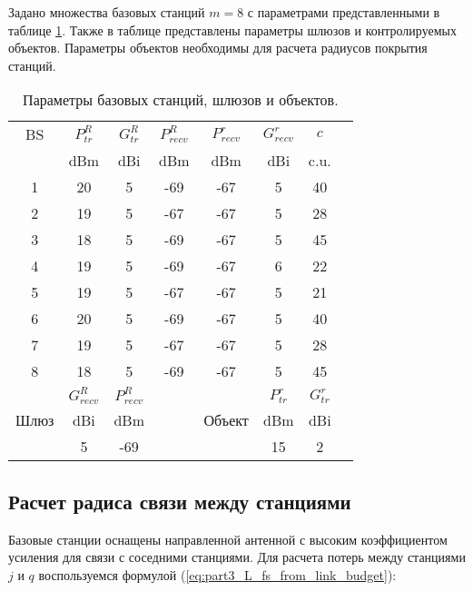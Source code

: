Задано множества базовых станций $m = 8$ с параметрами представленными в таблице \cref{tab:part3_BS}. Также в таблице представлены параметры шлюзов и контролируемых объектов. Параметры объектов необходимы для расчета радиусов покрытия станций.

\begin{table}[b]\centering
  \begin{tabular}{|c||c|c|c|c|c|c|c|}\hline
    BS & $P_{tr}^R$ &  $G_{tr}^R$ & $P_{recv}^R$ & $P_{recv}^r$ & $G_{recv}^r$ & $c$ \\ \cline{2-1} \cline{3-1} \cline{4-1} \cline{5-1}  \cline{6-1} \cline{7-1}
     & dBm & dBi & dBm & dBm & dBi & c.u.  \\ \hline
    1 & 20 & 5 & -69 & -67 & 5 & 40 \\ 

    2 & 19 & 5 & -67 & -67 & 5 & 28 \\ 

    3 & 18 & 5 & -69 & -67 & 5 & 45 \\ 

    4 & 19 & 5 & -69 & -67 & 6 & 22 \\ 

    5 & 19 & 5 & -67 & -67 & 5 & 21 \\ 

    6 & 20 & 5 & -69 & -67 & 5 & 40 \\ 

    7 & 19 & 5 & -67 & -67 & 5 & 28 \\

    8 & 18 & 5 & -69 & -67 & 5 & 45 \\ \hline \hline  

    &  $G_{recv}^R$ & $P_{recv}^R$ &  & & $P_{tr}^r$ & $G_{tr}^r$ \\  \cline{2-1} \cline{3-1} \cline{6-1} \cline{7-1} 

    Шлюз& dBi & dBm & & Объект & dBm & dBi  \\  \cline{2-1} \cline{3-1}  \cline{6-1} \cline{7-1}

    &  5 & -69 & &  & 15 & 2  \\ \hline

  \end{tabular}\caption{Параметры базовых станций, шлюзов и объектов.}\label{tab:part3_BS} 
\end{table}

\subsection{Расчет радиса связи между станциями}
Базовые станции оснащены направленной антенной с высоким коэффициентом усиления для связи с соседними станциями.
Для расчета потерь между станциями $j$ и $q$ воспользуемся формулой (\ref{eq:part3_L_fs_from_link_budget}):

